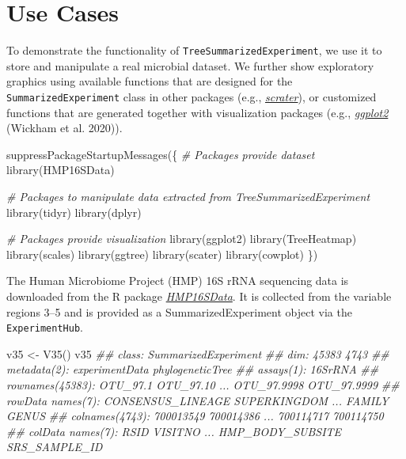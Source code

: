 \documentclass[]{article}
\newcommand{\hlstr}[1]{\textcolor[rgb]{0.251,0.627,0.251}{#1}}%
\newcommand{\hlcom}[1]{\textcolor[rgb]{0.502,0.502,0.502}{\textit{#1}}}%
\newcommand{\hlstd}[1]{\textcolor[rgb]{0.251,0.251,0.251}{#1}}%
\newcommand{\hlkwd}[1]{\textcolor[rgb]{0.878,0.439,0.125}{#1}}%
\newenvironment{Shaded}{\begin{myshaded}}{\end{myshaded}}
\newcommand{\KeywordTok}[1]{\hlkwd{#1}}
\newcommand{\StringTok}[1]{\hlstr{#1}}
\newcommand{\CommentTok}[1]{\hlcom{#1}}
\newcommand{\NormalTok}[1]{\hlstd{#1}}
\begin{document}
\hypertarget{use-cases}{%
\section{Use Cases }\label{use-cases}}

To demonstrate the functionality of \texttt{TreeSummarizedExperiment}, we use it to store and manipulate a real microbial dataset. We further show exploratory graphics using available functions that are designed for the \texttt{SummarizedExperiment} class in other packages (e.g., \emph{\href{https://bioconductor.org/packages/3.11/scrater}{scrater}}), or customized functions that are generated together with visualization packages (e.g., \emph{\href{https://CRAN.R-project.org/package=ggplot2}{ggplot2}} (Wickham et al. 2020)).

\begin{Shaded}
\begin{Highlighting}[]
\KeywordTok{suppressPackageStartupMessages}\NormalTok{(\{}
  \CommentTok{# Packages provide dataset}
  \KeywordTok{library}\NormalTok{(HMP16SData)}
  
  \CommentTok{# Packages to manipulate data extracted from TreeSummarizedExperiment}
  \KeywordTok{library}\NormalTok{(tidyr)}
  \KeywordTok{library}\NormalTok{(dplyr)}
  
  \CommentTok{# Packages provide visualization}
  \KeywordTok{library}\NormalTok{(ggplot2)}
  \KeywordTok{library}\NormalTok{(TreeHeatmap)}
  \KeywordTok{library}\NormalTok{(scales)}
  \KeywordTok{library}\NormalTok{(ggtree)}
  \KeywordTok{library}\NormalTok{(scater)}
  \KeywordTok{library}\NormalTok{(cowplot)}
\NormalTok{  \})}
\end{Highlighting}
\end{Shaded}

The Human Microbiome Project (HMP) 16S rRNA sequencing data is downloaded from the R package \emph{\href{https://bioconductor.org/packages/3.11/HMP16SData}{HMP16SData}}. It is collected from the variable regions 3--5 and is provided as a SummarizedExperiment object via the \texttt{ExperimentHub}.

\begin{Shaded}
\begin{Highlighting}[]
\NormalTok{v35 <-}\StringTok{ }\KeywordTok{V35}\NormalTok{()}
\NormalTok{v35}
\CommentTok{## class: SummarizedExperiment }
\CommentTok{## dim: 45383 4743 }
\CommentTok{## metadata(2): experimentData phylogeneticTree}
\CommentTok{## assays(1): 16SrRNA}
\CommentTok{## rownames(45383): OTU_97.1 OTU_97.10 ... OTU_97.9998 OTU_97.9999}
\CommentTok{## rowData names(7): CONSENSUS_LINEAGE SUPERKINGDOM ... FAMILY GENUS}
\CommentTok{## colnames(4743): 700013549 700014386 ... 700114717 700114750}
\CommentTok{## colData names(7): RSID VISITNO ... HMP_BODY_SUBSITE SRS_SAMPLE_ID}
\end{Highlighting}
\end{Shaded}
\end{document}
